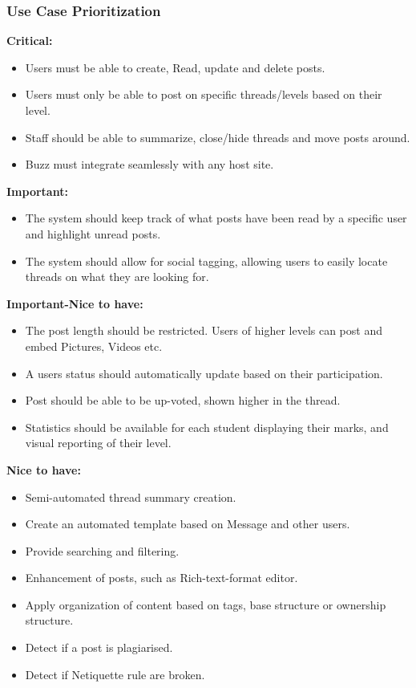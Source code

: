 \documentclass[12pt]{article}
\begin{document}
\subsubsection{Use Case Prioritization}
\textbf{Critical:}
\begin{itemize}
\item Users must be able to create, Read, update and delete posts.
\item Users must only be able to post on specific threads/levels based on their level.
\item Staff should be able to summarize, close/hide threads and move posts around.
\item Buzz must integrate seamlessly with any host site.
\end{itemize}
\textbf{Important:}
\begin{itemize}
\item The system should keep track of what posts have been read by a specific user and highlight unread posts.
\item The system should allow for social tagging, allowing users to easily locate threads on what they are looking for.
\end{itemize}
\textbf{Important-Nice to have:} 
\begin{itemize}
\item The post length should be restricted. Users of higher levels can post and embed Pictures, Videos etc.
\item A users status should automatically update based on their participation.
\item Post should be able to be up-voted, shown higher in the thread.
\item Statistics should be available for each student displaying their marks, and visual reporting of their level.
\end{itemize}
\newpage
\textbf{Nice to have:}
\begin{itemize}
\item Semi-automated thread summary creation.
\item Create an automated template based on Message and other users.
\item Provide searching and filtering.
\item Enhancement of posts, such as Rich-text-format editor.
\item Apply organization of content based on tags, base structure or ownership structure.
\item Detect if a post is plagiarised.
\item Detect if Netiquette rule are broken.
\end{itemize}
\end{document}
